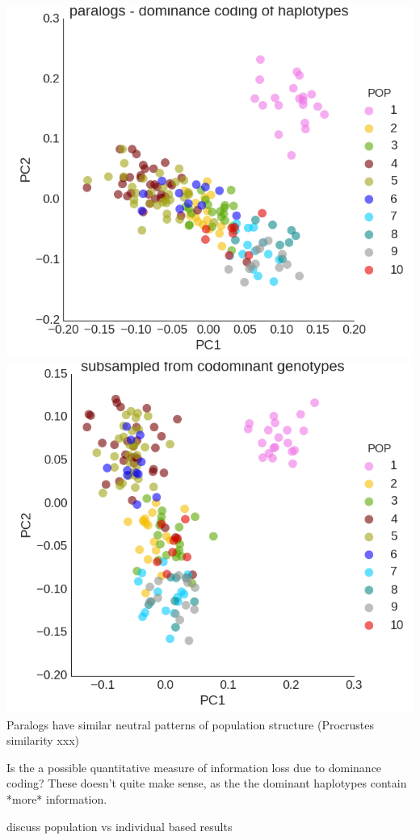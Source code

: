 \documentclass[12pt, one column]{article}
\begin{document}
\includegraphics[scale=.3]{figures/PCA_dom_paralogs.png}
\includegraphics[scale=.3]{figures/PCA_codom_subsample.png}
Paralogs have similar neutral patterns of population structure (Procrustes similarity xxx)

Is the a possible quantitative measure of information loss due to dominance coding?  These doesn't quite make sense, as the the dominant haplotypes contain *more* information.

discuss population vs individual based results
\end{document}
